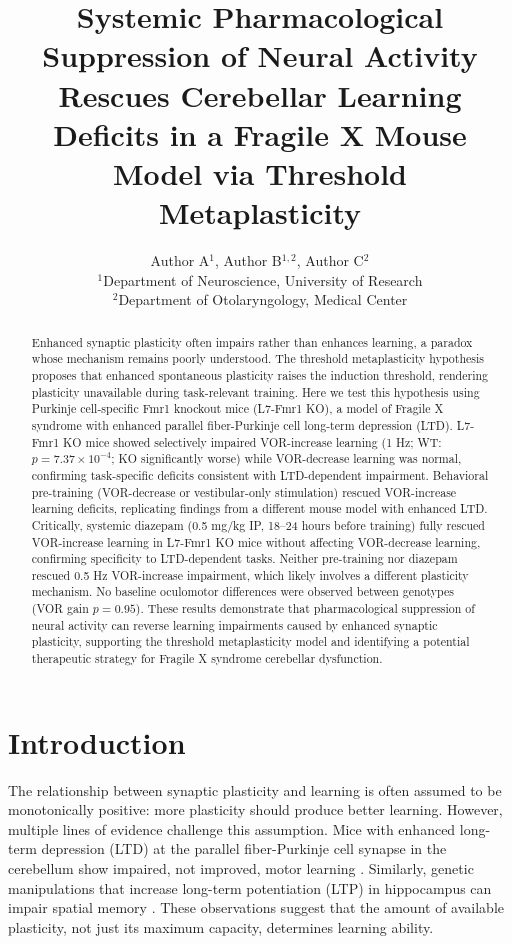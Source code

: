 \documentclass[11pt]{article}
\title{Systemic Pharmacological Suppression of Neural Activity Rescues Cerebellar Learning Deficits in a Fragile X Mouse Model via Threshold Metaplasticity}
\author{Author A$^{1}$, Author B$^{1,2}$, Author C$^{2}$ \\
\small $^{1}$Department of Neuroscience, University of Research \\
\small $^{2}$Department of Otolaryngology, Medical Center}
\date{}
\begin{document}
\maketitle

\begin{abstract}
Enhanced synaptic plasticity often impairs rather than enhances learning, a paradox whose mechanism remains poorly understood. The threshold metaplasticity hypothesis proposes that enhanced spontaneous plasticity raises the induction threshold, rendering plasticity unavailable during task-relevant training. Here we test this hypothesis using Purkinje cell-specific Fmr1 knockout mice (L7-Fmr1 KO), a model of Fragile X syndrome with enhanced parallel fiber-Purkinje cell long-term depression (LTD). L7-Fmr1 KO mice showed selectively impaired VOR-increase learning (1 Hz; WT: $p = 7.37 \times 10^{-4}$; KO significantly worse) while VOR-decrease learning was normal, confirming task-specific deficits consistent with LTD-dependent impairment. Behavioral pre-training (VOR-decrease or vestibular-only stimulation) rescued VOR-increase learning deficits, replicating findings from a different mouse model with enhanced LTD. Critically, systemic diazepam (0.5 mg/kg IP, 18--24 hours before training) fully rescued VOR-increase learning in L7-Fmr1 KO mice without affecting VOR-decrease learning, confirming specificity to LTD-dependent tasks. Neither pre-training nor diazepam rescued 0.5 Hz VOR-increase impairment, which likely involves a different plasticity mechanism. No baseline oculomotor differences were observed between genotypes (VOR gain $p = 0.95$). These results demonstrate that pharmacological suppression of neural activity can reverse learning impairments caused by enhanced synaptic plasticity, supporting the threshold metaplasticity model and identifying a potential therapeutic strategy for Fragile X syndrome cerebellar dysfunction.
\end{abstract}

\section{Introduction}

The relationship between synaptic plasticity and learning is often assumed to be monotonically positive: more plasticity should produce better learning. However, multiple lines of evidence challenge this assumption. Mice with enhanced long-term depression (LTD) at the parallel fiber-Purkinje cell synapse in the cerebellum show impaired, not improved, motor learning \citep{hansel2006,schonewille2011}. Similarly, genetic manipulations that increase long-term potentiation (LTP) in hippocampus can impair spatial memory \citep{bhatt2012}. These observations suggest that the amount of available plasticity, not just its maximum capacity, determines learning ability.
\end{document}
